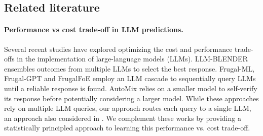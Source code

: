 

\subsection{Related literature}


\paragraph{Performance vs cost trade-off in LLM predictions.} Several recent studies have explored optimizing the cost and performance trade-offs in the implementation of
large-language models (LLMs). LLM-BLENDER \citep{jiang2023llm} ensembles outcomes from
multiple LLMs to select the best response. Frugal-ML, Frugal-GPT \citep{chen2020frugalml,chen2024frugalgptTMLR} and FrugalFoE \cite{wang2023fusing} employ an LLM cascade to sequentially query LLMs until a reliable response is found. AutoMix \citep{madaan2023automix} relies on a smaller model to self-verify its response before potentially considering a larger model. While these approaches rely
on multiple LLM queries, our approach routes each query to a single LLM, an approach also considered in \citet{hu2024routerbench}. We complement these works by providing a statistically principled approach to learning this performance vs. cost trade-off. 

